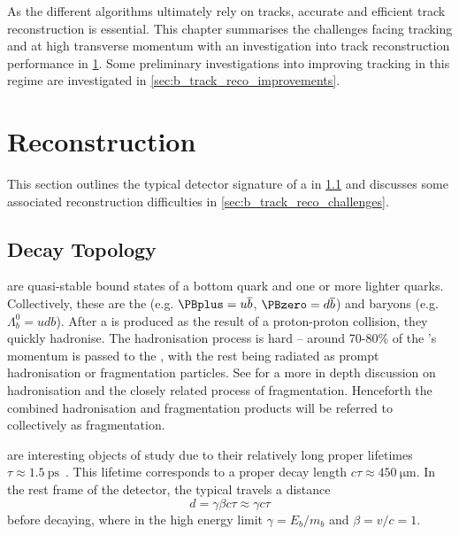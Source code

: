 As the different \btagging algorithms ultimately rely on tracks, accurate and efficient track reconstruction is essential.
This chapter summarises the challenges facing tracking and \btagging at high transverse momentum with an investigation into track reconstruction performance in \cref{sec:b_had_reco}.
Some preliminary investigations into improving tracking in this regime are investigated in \cref{sec:b_track_reco_improvements}.





\section{\texorpdfstring{\bhadron}{b-hadron} Reconstruction}
\label{sec:b_had_reco}

This section outlines the typical detector signature of a \bhadron in \cref{sec:b_decay_topology} and discusses some associated reconstruction difficulties in \cref{sec:b_track_reco_challenges}.


\subsection{Decay Topology}
\label{sec:b_decay_topology}

\bhadrons are quasi-stable bound states of a bottom quark and one or more lighter quarks.
Collectively, these are the \bmesons (e.g. $\PBplus = u \overline{b}$, $\PBzero = d \overline{b}$) and baryons (e.g. $\Lambda_b^0 = udb$).
After a \bquark is produced as the result of a proton-proton collision, they quickly hadronise.
The hadronisation process is hard -- around 70-80\% of the \bquark's momentum is passed to the \bhadron, with the rest being radiated as prompt hadronisation or fragmentation particles.
See  for a more in depth discussion on hadronisation and the closely related process of fragmentation.
Henceforth the combined hadronisation and fragmentation products will be referred to collectively as fragmentation.

\bhadrons are interesting objects of study due to their relatively long proper lifetimes $\tau \approx \SI{1.5}{\pico\second}$~\cite{PhysRevD.98.030001}.
This lifetime corresponds to a proper decay length $c \tau \approx \SI{450}{\micro\meter}$.
In the rest frame of the detector, the typical \bhadron travels a distance 
%
\begin{equation}
  d = \gamma \beta c \tau \approx \gamma c \tau
\end{equation}
%
before decaying, where in the high energy limit $\gamma = E_b/m_b$ and $\beta = v/c = 1$.


